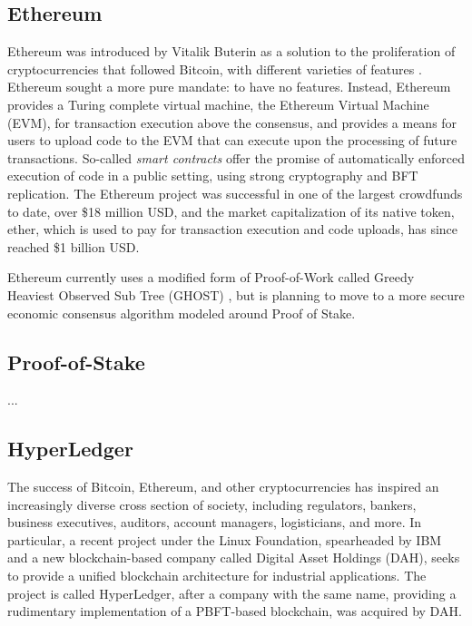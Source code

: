 \subsection{Ethereum}

Ethereum was introduced by Vitalik Buterin as a solution to the proliferation of cryptocurrencies that followed Bitcoin,
with different varieties of features \cite{buterin2013ethereum}.
Ethereum sought a more pure mandate: to have no features.
Instead, Ethereum provides a Turing complete virtual machine, the Ethereum Virtual Machine (EVM), for transaction execution above the consensus,
and provides a means for users to upload code to the EVM that can execute upon the processing of future transactions.
So-called \emph{smart contracts} \cite{szabo1997formalizing} offer the promise of automatically enforced execution of code in a public setting, 
using strong cryptography and BFT replication. 
The Ethereum project was successful in one of the largest crowdfunds to date, over \$18 million USD, 
and the market capitalization of its native token, ether, which is used to pay for transaction execution and code uploads,
has since reached \$1 billion USD.

Ethereum currently uses a modified form of Proof-of-Work called Greedy Heaviest Observed Sub Tree (GHOST) \cite{ghost},
but is planning to move to a more secure economic consensus algorithm modeled around Proof of Stake.

\subsection{Proof-of-Stake}
...

\subsection{HyperLedger}

The success of Bitcoin, Ethereum, and other cryptocurrencies has inspired an increasingly diverse cross section of society,
including regulators, bankers, business executives, auditors, account managers, logisticians, and more.
In particular, a recent project under the Linux Foundation, spearheaded by IBM and a new blockchain-based company called Digital Asset Holdings (DAH), 
seeks to provide a unified blockchain architecture for industrial applications. The project is called HyperLedger,
after a company with the same name, providing a rudimentary implementation of a PBFT-based blockchain, was acquired by DAH.

